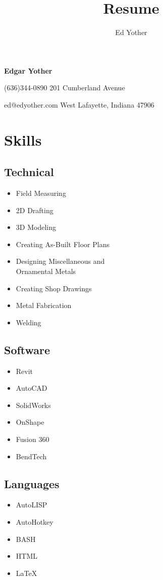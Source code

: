 \documentclass[9pt]{extarticle}
\title{Resume}
\author{Ed Yother}
\begin{document}
\begin{center}
    \textbf{Edgar Yother}
\end{center}

(636)344-0890 \hfill 201 Cumberland Avenue 

ed@edyother.com \hfill West Lafayette, Indiana 47906 


\section*{Skills}

\begin{multicols}{3}
\subsection*{Technical}
\begin{itemize}
    \item Field Measuring  
    \item 2D Drafting
    \item 3D Modeling
    \item Creating As-Built Floor Plans
    \item Designing Miscellaneous and \\
        Ornamental Metals 
    \item Creating Shop Drawings
    \item Metal Fabrication  
    \item Welding  
\end{itemize}
\columnbreak
\subsection*{Software}
\begin{itemize}
    \item Revit
    \item AutoCAD  
    \item SolidWorks  
    \item OnShape
    \item Fusion 360
    \item BendTech  
\end{itemize}
\columnbreak
\subsection*{Languages}
\begin{itemize}
    \item AutoLISP
    \item AutoHotkey
    \item BASH
    \item HTML
    \item \LaTeX
\end{itemize}
\end{multicols}
\end{document}
